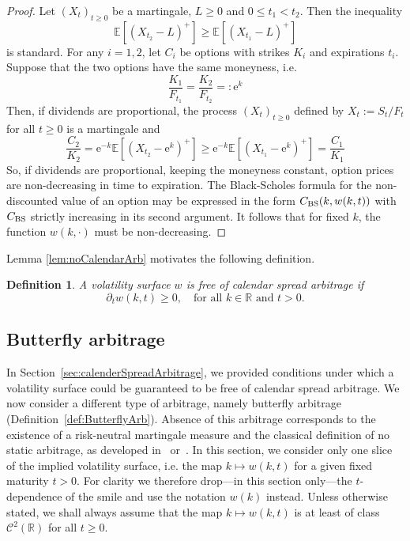 \documentclass[12pt]{article}
\newtheorem{definition}{Definition}[section]
\numberwithin{equation}{section}
\newcommand{\Ex}{\mathrm{e}}
\newcommand{\E}{\mathbb{E}}
\newcommand{\BS}{\rm BS}
\begin{document}
\begin{proof}
Let $\left(X_t\right)_{t\geq 0}$ be a martingale, $L\geq 0$ and $0\leq t_1<t_2$.
Then the inequality
$$
\E\left[(X_{t_2}-L)^+\right]\geq \E\left[(X_{t_1}-L)^+\right]
$$
is standard.
For any $i=1,2$, let $C_i$ be options with strikes $K_i$ and expirations $t_i$.
Suppose that the two options have the same moneyness, i.e.
$$
\frac{K_1}{F_{t_1}}=\frac{K_2}{F_{t_2}}=:\Ex^k
$$
Then, if dividends are proportional, {the process $(X_t)_{t\geq 0}$ defined by }
$X_t := S_t/F_{t}$ for all $t\geq 0$ is a martingale and
$$
\frac{C_2}{K_2}=\Ex^{-k}\E\left[\left(X_{t_2}-\Ex^{k}\right)^+\right] \geq
\Ex^{-k}\E\left[\left(X_{t_1}-\Ex^{k}\right)^+\right]=\frac{C_1}{K_1}
$$
So, if dividends are proportional, keeping the moneyness constant, option prices are non-decreasing in time to expiration.
The Black-Scholes formula for the non-discounted value of an option may be expressed in the form
{$C_{\BS}(k, w(k,t))$  with $C_{\BS}$ strictly increasing in its second argument.
It follows that for fixed $k$, the function $w(k,\cdot)$ must be non-decreasing.}
\end{proof}

\noindent Lemma \ref{lem:noCalendarArb} motivates the following definition.

\begin{definition}\label{def:CalendarArb}
{A volatility surface $w$ is free of calendar spread arbitrage if
$$
\partial _t w(k,t) \geq 0,
\quad\text{for all }k\in\mathbb{R}\text{ and }t>0.
$$
}
\end{definition}






\subsection{Butterfly arbitrage}\label{sec:butterflySpreadArbitrage}

In Section~\ref{sec:calenderSpreadArbitrage}, we provided conditions under which a volatility surface could be guaranteed to be free of calendar spread arbitrage.
We now consider a different type of arbitrage, namely butterfly arbitrage (Definition~\ref{def:ButterflyArb}).  Absence of this arbitrage corresponds to the existence of a risk-neutral martingale measure and the classical definition of no static arbitrage, 
as developed in~\cite{Follmer} or~\cite{CoxHobson}.
In this section, we consider only one slice of the implied volatility surface, i.e. the map $k\mapsto w(k,t)$
for a given fixed maturity $t>0$.
For clarity we therefore drop---in this section only---the $t$-dependence of the smile and use the notation $w(k)$ instead.
Unless otherwise stated, we shall always assume that the map $k\mapsto w(k,t)$ is at least of class $\mathcal{C}^2(\mathbb{R})$ for all $t\geq 0$.
\end{document}
